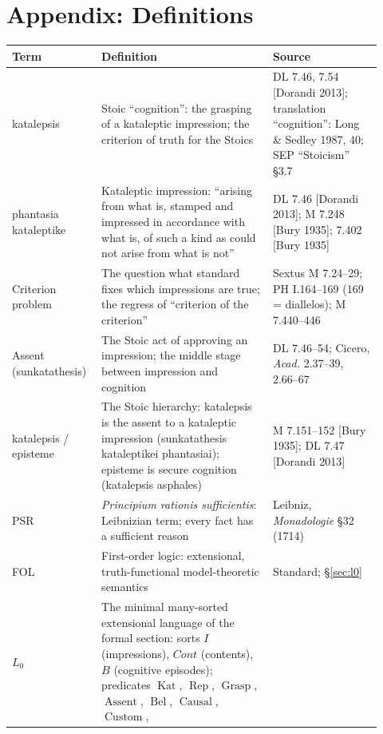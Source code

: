 \documentclass[11pt]{article}
\theoremstyle{plain}
\theoremstyle{definition}
\theoremstyle{remark}
\begin{document}
\section{Appendix: Definitions}
\label{sec:appendix}

\begin{center}
\begin{longtable}{p{0.20\linewidth} p{0.44\linewidth} >{\raggedright\arraybackslash}p{0.28\linewidth}}
\hline
\textbf{Term} & \textbf{Definition} & \textbf{Source} \\
\hline
katalepsis &
Stoic ``cognition'': the grasping of a kataleptic impression; the
criterion of truth for the Stoics &
DL 7.46, 7.54 [Dorandi 2013]; translation ``cognition'': Long \&
Sedley 1987, 40; SEP ``Stoicism'' \S3.7 \\
\hline
phantasia kataleptike &
Kataleptic impression: ``arising from what is, stamped and impressed
in accordance with what is, of such a kind as could not arise from
what is not'' &
DL 7.46 [Dorandi 2013]; M 7.248 [Bury 1935]; 7.402 [Bury 1935] \\
\hline
Criterion problem &
The question what standard fixes which impressions are true; the
regress of ``criterion of the criterion'' &
Sextus M 7.24--29; PH I.164--169 (169 = diallelos); M 7.440--446 \\
\hline
Assent (sunkatathesis) &
The Stoic act of approving an impression; the middle stage between
impression and cognition &
DL 7.46--54; Cicero, \emph{Acad.} 2.37--39, 2.66--67 \\
\hline
katalepsis / episteme &
The Stoic hierarchy: katalepsis is the assent to a kataleptic
impression (sunkatathesis kataleptikei phantasiai); episteme is
secure cognition (katalepsis asphales) &
M 7.151--152 [Bury 1935]; DL 7.47 [Dorandi 2013] \\
\hline
PSR &
\emph{Principium rationis sufficientis}: Leibnizian term; every fact
has a sufficient reason &
Leibniz, \emph{Monadologie} \S32 (1714) \\
\hline
FOL &
First-order logic: extensional, truth-functional model-theoretic
semantics &
Standard; \S\ref{sec:l0} \\
\hline
$L_0$ &
The minimal many-sorted extensional language of the formal section:
sorts $I$ (impressions), $\mathit{Cont}$ (contents), $B$ (cognitive
episodes); predicates $\operatorname{Kat}$, $\operatorname{Rep}$,
$\operatorname{Grasp}$, $\operatorname{Assent}$,
$\operatorname{Bel}$, $\operatorname{Causal}$, $\operatorname{Custom}$,

\end{longtable}
\end{center}
\end{document}
